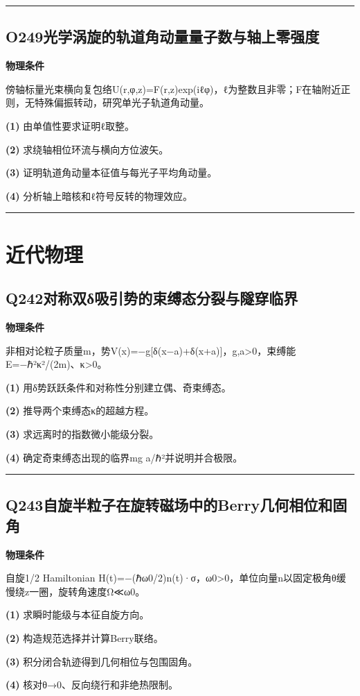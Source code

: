 \documentclass[UTF8,a4paper,11pt,oneside,openany]{ctexbook}
\begin{document}
\par\bigskip\hrule\bigskip
\section*{O249\quad 光学涡旋的轨道角动量量子数与轴上零强度}
\textbf{物理条件}\par 傍轴标量光束横向复包络U(r,φ,z)=F(r,z)exp(iℓφ)，ℓ为整数且非零；F在轴附近正则，无特殊偏振转动，研究单光子轨道角动量。
\par\noindent\textbf{(1)} 由单值性要求证明ℓ取整。
\par\noindent\textbf{(2)} 求绕轴相位环流与横向方位波矢。
\par\noindent\textbf{(3)} 证明轨道角动量本征值与每光子平均角动量。
\par\noindent\textbf{(4)} 分析轴上暗核和ℓ符号反转的物理效应。

\par\bigskip\hrule\bigskip
\chapter{近代物理}
\section*{Q242\quad 对称双δ吸引势的束缚态分裂与隧穿临界}
\textbf{物理条件}\par 非相对论粒子质量m，势V(x)=−g[δ(x−a)+δ(x+a)]，g,a>0，束缚能E=−ℏ²κ²/(2m)、κ>0。
\par\noindent\textbf{(1)} 用δ势跃跃条件和对称性分别建立偶、奇束缚态。
\par\noindent\textbf{(2)} 推导两个束缚态κ的超越方程。
\par\noindent\textbf{(3)} 求远离时的指数微小能级分裂。
\par\noindent\textbf{(4)} 确定奇束缚态出现的临界mg a/ℏ²并说明并合极限。

\par\bigskip\hrule\bigskip
\section*{Q243\quad 自旋半粒子在旋转磁场中的Berry几何相位和固角}
\textbf{物理条件}\par 自旋1/2 Hamiltonian H(t)=−(ℏω0/2)n(t)·σ，ω0>0，单位向量n以固定极角θ缓慢绕z一圈，旋转角速度Ω≪ω0。
\par\noindent\textbf{(1)} 求瞬时能级与本征自旋方向。
\par\noindent\textbf{(2)} 构造规范选择并计算Berry联络。
\par\noindent\textbf{(3)} 积分闭合轨迹得到几何相位与包围固角。
\par\noindent\textbf{(4)} 核对θ→0、反向绕行和非绝热限制。
\end{document}
